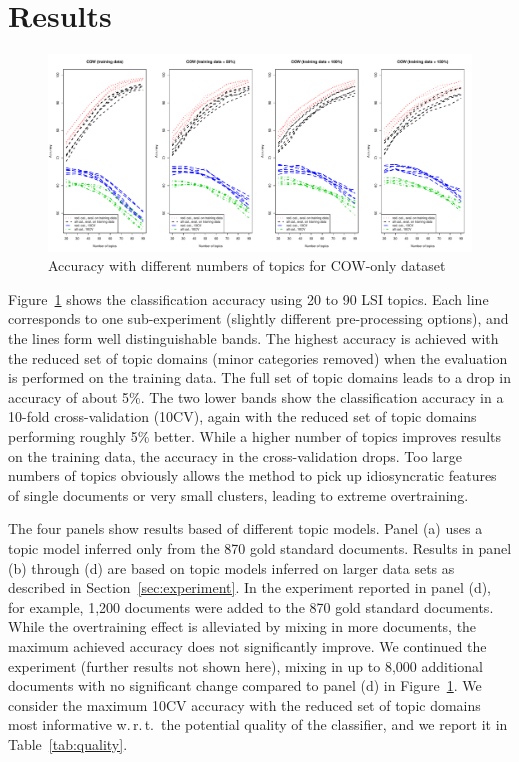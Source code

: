 \documentclass[11pt]{article}
\begin{document}
\section{Results}
\label{sec:results}

\begin{figure}[h]
  \centering
  \includegraphics[width=\textwidth]{graphics/cow.pdf}
  \caption{Accuracy with different numbers of topics for COW-only dataset}
  \label{fig:cow}
\end{figure}

Figure~\ref{fig:cow} shows the classification accuracy using 20 to 90 LSI topics.
Each line corresponds to one sub-experiment (slightly different pre-processing options), and the lines form well distinguishable bands.
The highest accuracy is achieved with the reduced set of topic domains (minor categories removed) when the evaluation is performed on the training data.
The full set of topic domains leads to a drop in accuracy of about 5\%.
The two lower bands show the classification accuracy in a 10-fold cross-validation (10CV), again with the reduced set of topic domains performing roughly 5\% better.
While a higher number of topics improves results on the training data, the accuracy in the cross-validation drops.
Too large numbers of topics obviously allows the method to pick up idiosyncratic features of single documents or very small clusters, leading to extreme overtraining.

The four panels show results based of different topic models.
Panel (a) uses a topic model inferred only from the 870 gold standard documents.
Results in panel (b) through (d) are based on topic models inferred on larger data sets as described in Section~\ref{sec:experiment}.
In the experiment reported in panel (d), for example, 1,200 documents were added to the 870 gold standard documents.
While the overtraining effect is alleviated by mixing in more documents, the maximum achieved accuracy does not significantly improve.
We continued the experiment (further results not shown here), mixing in up to 8,000 additional documents with no significant change compared to panel (d) in Figure~\ref{fig:cow}.
We consider the maximum 10CV accuracy with the reduced set of topic domains most informative w.\,r.\,t.\ the potential quality of the classifier, and we report it in Table~\ref{tab:quality}.
\end{document}
